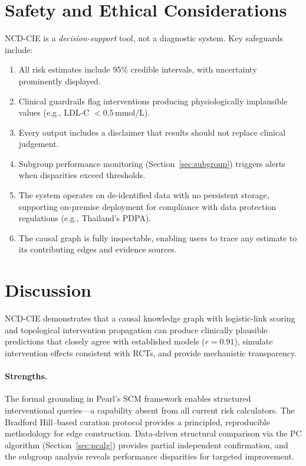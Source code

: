 \documentclass[runningheads]{llncs}
\begin{document}
\section{Safety and Ethical Considerations}\label{sec:ethics}

NCD-CIE is a \emph{decision-support} tool, not a diagnostic system.
Key safeguards include:
\begin{enumerate}
\item All risk estimates include 95\% credible intervals, with
  uncertainty prominently displayed.
\item Clinical guardrails flag interventions producing physiologically
  implausible values (e.g., LDL-C $< 0.5$\,mmol/L).
\item Every output includes a disclaimer that results should not
  replace clinical judgement.
\item Subgroup performance monitoring (Section~\ref{sec:subgroup})
  triggers alerts when disparities exceed thresholds.
\item The system operates on de-identified data with no persistent
  storage, supporting on-premise deployment for compliance with data
  protection regulations (e.g., Thailand's PDPA).
\item The causal graph is fully inspectable, enabling users to trace
  any estimate to its contributing edges and evidence sources.
\end{enumerate}

\section{Discussion}\label{sec:discussion}

NCD-CIE demonstrates that a causal knowledge graph with logistic-link
scoring and topological intervention propagation can produce
clinically plausible predictions that closely agree with established
models ($r = 0.91$), simulate intervention effects consistent with
RCTs, and provide mechanistic transparency.

\paragraph{Strengths.}
The formal grounding in Pearl's SCM framework enables structured
interventional queries---a capability absent from all current risk
calculators.  The Bradford Hill--based curation
protocol provides a principled, reproducible methodology for edge
construction.  Data-driven structural comparison via the PC algorithm
(Section~\ref{sec:pcalg}) provides partial independent confirmation,
and the subgroup analysis reveals performance
disparities for targeted improvement.
\end{document}
